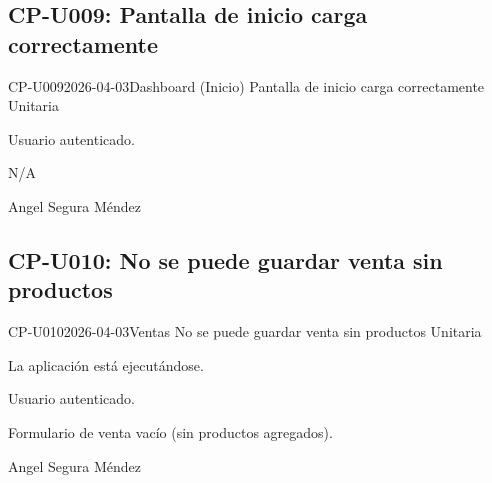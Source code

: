 \subsection{CP-U009: Pantalla de inicio carga correctamente}
\def\cpPasos{%
  \item Iniciar sesión.
  \item Observar la pantalla de Inicio/Dashboard.
  \item Verificar si muestra métricas (ventas, productos, stock bajo, etc.).}
\def\cpResultadoE{%
  \item El dashboard muestra métricas del sistema sin errores.}
\def\cpResultadoO{El dashboard mostró: Total Productos: 5, Productos Activos: 5,
  Ventas Mensuales: \CRC{}24,000, Stock Bajo: 0. También mostró sección de acciones
  rápidas. Sin errores.}
\casoprueba
  {CP-U009}{2026-04-03}{Dashboard (Inicio)}
  {Pantalla de inicio carga correctamente}
  {Unitaria}{\estadoAprobado}
  {\item Usuario autenticado.}
  {\item N/A}
  {Angel Segura Méndez}

\subsection{CP-U010: No se puede guardar venta sin productos}
\def\cpPasos{%
  \item Navegar a ``Ventas'' \arr{} Nueva venta.
  \item No agregar ningún producto.
  \item Intentar guardar/confirmar la venta.}
\def\cpResultadoE{%
  \item El sistema muestra error indicando que la venta debe tener al menos un producto.}
\def\cpResultadoO{El sistema mostró el mensaje: ``debemos agregar al menos una venta''.
  No guardó la venta vacía.}
\casoprueba
  {CP-U010}{2026-04-03}{Ventas}
  {No se puede guardar venta sin productos}
  {Unitaria}{\estadoAprobado}
  {\item La aplicación está ejecutándose.
   \item Usuario autenticado.}
  {\item Formulario de venta vacío (sin productos agregados).}
  {Angel Segura Méndez}
